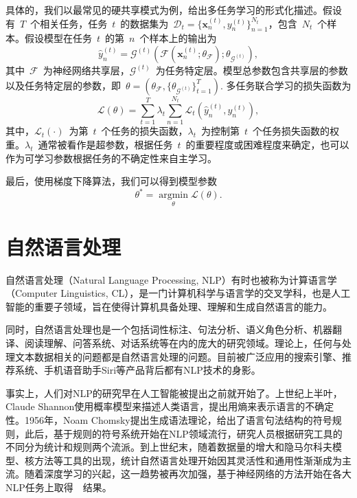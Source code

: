 具体的，我们以最常见的硬共享模式为例，给出多任务学习的形式化描述。假设有~$T$~个相关任务，任务~$t$~的数据集为~$\mathcal{D}_t = \lbrace \mathbf{x}_n^{(t)}, y_n^{(t)} \rbrace_{n=1}^{N_t}$，包含~$N_t$~个样本。假设模型在任务~$t$~的第~$n$~个样本上的输出为
\begin{equation}
	\hat{y}_n^{(t)} = \mathcal{G}^{(t)}(\mathcal{F}(\mathbf{x}_n^{(t)}; \theta_\mathcal{F}) ; \theta_{\mathcal{G}^{(t)}}),
\end{equation}
其中~$\mathcal{F}$~为神经网络共享层，$\mathcal{G}^{(t)}$~为任务特定层。模型总参数包含共享层的参数以及任务特定层的参数，即~$\theta = (\theta_\mathcal{F}, \{ \theta_{\mathcal{G}^{(t)}}\}_{t=1}^T)$. 多任务联合学习的损失函数为
\begin{equation}
	\mathcal{L}(\theta) = \sum_{t=1}^T\lambda_t\sum_{n=1}^{N_t}\mathcal{L}_t(\hat{y}_n^{(t)}, y_n^{(t)}),
\end{equation}
其中，$\mathcal{L}_t(\cdot)$~为第~$t$~个任务的损失函数，$\lambda_t$~为控制第~$t$~个任务损失函数的权重。$\lambda_t$~通常被看作是超参数，根据任务~$t$~的重要程度或困难程度来确定，也可以作为可学习参数根据任务的不确定性来自主学习\cite{DBLP:conf/cvpr/KendallGC18}。

最后，使用梯度下降算法，我们可以得到模型参数
\begin{equation}
	\theta ^* = \mathop{\arg\min}\limits_{\theta} \mathcal{L}(\theta).
\end{equation}

\section{自然语言处理}
\label{sec:nlp}

自然语言处理（Natural Language Processing, NLP）有时也被称为计算语言学（Computer Linguistics, CL），是一门计算机科学与语言学的交叉学科，也是人工智能的重要子领域，旨在使得计算机具备处理、理解和生成自然语言的能力。

同时，自然语言处理也是一个包括词性标注、句法分析、语义角色分析、机器翻译、阅读理解、问答系统、对话系统等在内的庞大的研究领域。理论上，任何与处理文本数据相关的问题都是自然语言处理的问题。目前被广泛应用的搜索引擎、推荐系统、手机语音助手Siri等产品背后都有NLP技术的身影。

事实上，人们对NLP的研究早在人工智能被提出之前就开始了。上世纪上半叶，Claude Shannon使用概率模型来描述人类语言，提出用熵来表示语言的不确定性。1956年，Noam Chomsky提出生成语法理论，给出了语言句法结构的符号规则，此后，基于规则的符号系统开始在NLP领域流行，研究人员根据研究工具的不同分为统计和规则两个流派。到上世纪末，随着数据量的增大和隐马尔科夫模型、核方法等工具的出现，统计自然语言处理开始因其灵活性和通用性渐渐成为主流。随着深度学习的兴起，这一趋势被再次加强，基于神经网络的方法开始在各大NLP任务上取得~\sArt~结果。

